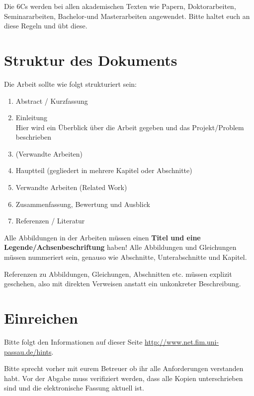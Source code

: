 Die 6Cs werden bei allen akademischen Texten wie Papern, Doktorarbeiten, Seminararbeiten, Bachelor-und Masterarbeiten angewendet.
Bitte haltet euch an diese Regeln und übt diese.

\section{Struktur des Dokuments}

Die Arbeit sollte wie folgt strukturiert sein:

\begin{enumerate}
	\item Abstract / Kurzfassung
	\item Einleitung \\
	Hier wird ein Überblick über die Arbeit gegeben und das Projekt/Problem beschrieben
	\item (Verwandte Arbeiten)
	\item Hauptteil (gegliedert in mehrere Kapitel oder Abschnitte)
	\item Verwandte Arbeiten (Related Work)
	\item Zusammenfassung, Bewertung und Ausblick
	\item Referenzen / Literatur
\end{enumerate}
Alle Abbildungen in der Arbeiten müssen einen \textbf{Titel und eine Legende/Achsenbeschriftung} haben!
Alle Abbildungen und Gleichungen müssen nummeriert sein, genauso wie Abschnitte, Unterabschnitte und Kapitel.

Referenzen zu Abbildungen, Gleichungen, Abschnitten etc. müssen explizit geschehen, also mit direkten Verweisen 
anstatt ein unkonkreter Beschreibung.



\section{Einreichen}
Bitte folgt den Informationen auf dieser Seite
\url{http://www.net.fim.uni-passau.de/hints}.

Bitte sprecht vorher mit eurem Betreuer ob ihr alle Anforderungen verstanden habt. Vor der Abgabe muss verifiziert werden, dass alle Kopien unterschrieben sind und die elektronische Fassung aktuell ist.



